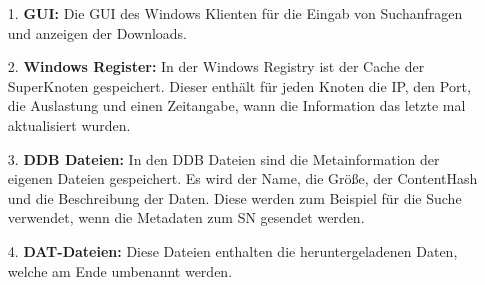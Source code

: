 \begin{itemize}
\item[1.] \textbf{GUI:} Die GUI des Windows Klienten für die Eingab von Suchanfragen und anzeigen der Downloads.
\item[2.] \textbf{Windows Register:} In der Windows Registry ist der Cache der SuperKnoten gespeichert.
Dieser enthält für jeden Knoten die IP, den Port, die Auslastung und einen Zeitangabe, wann die Information das letzte mal aktualisiert wurden.
\item[3.] \textbf{DDB Dateien:} In den DDB Dateien sind die Metainformation der eigenen Dateien gespeichert. Es wird der Name, die Größe, der ContentHash und die Beschreibung der Daten. Diese werden zum Beispiel für die Suche verwendet, wenn die Metadaten zum SN gesendet werden.
\item[4.] \textbf{DAT-Dateien:} Diese Dateien enthalten die heruntergeladenen Daten, welche am Ende umbenannt werden.
\end{itemize}


